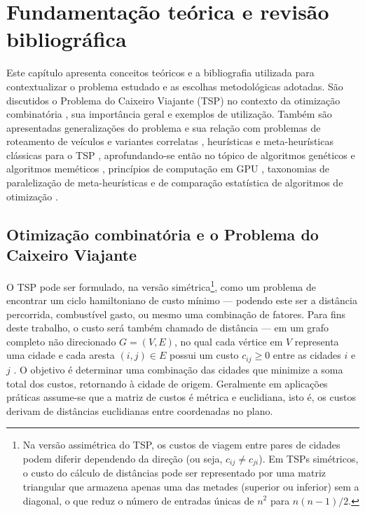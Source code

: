 \chapter{Fundamentação teórica e revisão bibliográfica}\label{cap2-revisao-bibliografica}

Este capítulo apresenta conceitos teóricos e a bibliografia utilizada
para contextualizar o problema estudado e as escolhas metodológicas
adotadas. São discutidos o Problema do Caixeiro Viajante (TSP) no
contexto da otimização combinatória
\autocite{cook2012pursuit,rosenkrantz1977analysis}, sua importância
geral e exemplos de utilização. Também são apresentadas generalizações
do problema e sua relação com problemas de roteamento de veículos e
variantes correlatas
\autocite{raff1983routing,bodin1981state,tan2021vehicle}, heurísticas e
meta-heurísticas clássicas para o TSP
\autocite{croes1958method,lin1973efficient,voudouris1999tsp},
aprofundando-se então no tópico de algoritmos genéticos e algoritmos
meméticos \autocite{larranaga1999genetic,goldberg1989genetic},
princípios de computação em GPU
\autocite{nvidia2024cuda,schulz2013gpu,tsp_gpu}, taxonomias de
paralelização de meta-heurísticas
\autocite{crainic2003parallel,crainic2010parallel,alba2005parallel} e de
comparação estatística de algoritmos de otimização
\autocite{demsar2006statistical}.

\section{Otimização combinatória e o Problema do Caixeiro Viajante}\label{sec-21-otimizacao-tsp}

O TSP pode ser formulado, na versão simétrica\footnote{Na versão
  assimétrica do TSP, os custos de viagem entre pares de cidades podem
  diferir dependendo da direção (ou seja, \(c_{ij} \neq c_{ji}\)). Em
  TSPs simétricos, o custo do cálculo de distâncias pode ser
  representado por uma matriz triangular que armazena apenas uma das
  metades (superior ou inferior) sem a diagonal, o que reduz o número de
  entradas únicas de \(n^2\) para \(n(n-1)/2\).}, como um problema de
encontrar um ciclo hamiltoniano de custo mínimo --- podendo este ser a
distância percorrida, combustível gasto, ou mesmo uma combinação de
fatores. Para fins deste trabalho, o custo será também chamado de
distância --- em um grafo completo não direcionado \(G = (V, E)\), no
qual cada vértice em \(V\) representa uma cidade e cada aresta
\((i, j) \in E\) possui um custo \(c_{ij} \geq 0\) entre as cidades
\(i\) e \(j\) \autocite{cook2012pursuit}. O objetivo é determinar uma
combinação das cidades que minimize a soma total dos custos, retornando
à cidade de origem. Geralmente em aplicações práticas assume-se que a
matriz de custos é métrica e euclidiana, isto é, os custos derivam de
distâncias euclidianas entre coordenadas no plano.


